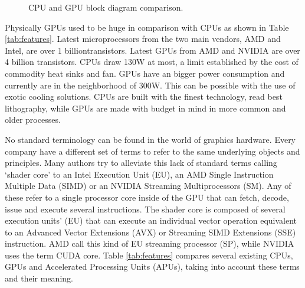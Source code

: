 \documentclass[review]{elsarticle}
\begin{document}
\begin{figure}[h]
\centering
{}
\caption{CPU and GPU block diagram comparison.}
\label{fig:cpu-gpu}
\end{figure}



Physically GPUs used to be huge in comparison with CPUs as shown in Table \ref{tab:features}. Latest microprocessors from the two main vendors, AMD and Intel, are over 1 billiontransistors. Latest GPUs from AMD and NVIDIA \cite{nvidia} are over 4 billion transistors. CPUs draw 130W at most, a limit established by the cost of commodity heat sinks and fan. GPUs have an bigger power consumption and currently are in the neighborhood of 300W. This can be possible with the use of exotic cooling solutions. CPUs are built with
the finest technology, read best lithography, while GPUs are made with budget in mind in more common and older processes. %

No standard terminology can be found in the world of graphics hardware.
Every company have a  different set of terms to refer to the same
underlying objects and principles. Many authors try to alleviate this
lack of standard terms calling `shader core' to an Intel Execution
Unit (EU), an AMD Single Instruction Multiple Data (SIMD) or an NVIDIA
Streaming Multiprocessors (SM). Any of these refer to a single
processor core inside of the GPU that can fetch, decode, issue and
execute several instructions. The shader core is composed of several
execution units' (EU) that can execute an individual vector operation
equivalent to an Advanced Vector Extensions (AVX) or Streaming SIMD
Extensions (SSE) instruction. AMD call this kind of EU streaming
processor (SP), while NVIDIA uses the term CUDA core. Table
\ref{tab:features} compares several existing CPUs, GPUs and
Accelerated Processing Units (APUs), taking into account these terms
and their meaning. %
\end{document}
